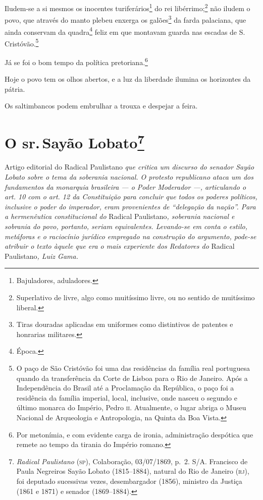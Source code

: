 Iludem-se a si mesmos os inocentes turiferários\footnote{Bajuladores,
  aduladores.} do rei libérrimo;\footnote{Superlativo de livre, algo
  como muitíssimo livre, ou no sentido de muitíssimo liberal.} não
iludem o povo, que através do manto plebeu enxerga os galões\footnote{
  Tiras douradas aplicadas em uniformes como distintivos de patentes e
  honrarias militares.} da farda palaciana, que ainda conservam da
quadra\footnote{Época.} feliz em que montavam guarda nas escadas de S.
Cristóvão.\footnote{O paço de São Cristóvão foi uma das residências da
  família real portuguesa quando da transferência da Corte de Lisboa
  para o Rio de Janeiro. Após a Independência do Brasil até a
  Proclamação da República, o paço foi a residência da família imperial,
  local, inclusive, onde nasceu o segundo e último monarca do Império,
  Pedro \textsc{ii}. Atualmente, o lugar abriga o Museu Nacional de Arqueologia e
  Antropologia, na Quinta da Boa Vista.}

Já se foi o bom tempo da política pretoriana.\footnote{Por metonímia, e
  com evidente carga de ironia, administração despótica que remete ao
  tempo da tirania do Império romano.}

Hoje o povo tem os olhos abertos, e a luz da liberdade ilumina os
horizontes da pátria.

Os saltimbancos podem embrulhar a trouxa e despejar a feira.

\chapter{O sr.\,Sayão Lobato\footnote{\emph{Radical Paulistano} (\textsc{sp}),
  Colaboração, 03/07/1869, p.~2. S/A. Francisco de Paula Negreiros Sayão
  Lobato (1815--1884), natural do Rio de Janeiro (\textsc{rj}), foi deputado
  sucessivas vezes, desembargador (1856), ministro da Justiça (1861 e
  1871) e senador (1869--1884).}}

\begin{didascalia}
Artigo editorial do Radical Paulistano \emph{que critica um discurso do
senador Sayão Lobato sobre o tema da soberania nacional. O protesto
republicano ataca um dos fundamentos da monarquia brasileira --- o Poder
Moderador ---, articulando o art. 10 com o art. 12 da Constituição para
concluir que todos os poderes políticos, inclusive o poder do imperador,
eram provenientes de ``delegação da nação''. Para a hermenêutica
constitucional do} Radical Paulistano\emph{, soberania nacional e
sobrania do povo, portanto, seriam equivalentes. Levando-se em conta o
estilo, metáforas e o raciocínio jurídico empregado na construção do
argumento, pode-se atribuir o texto àquele que era o mais experiente dos
Redatores do} Radical Paulistano\emph{, Luiz Gama.}
\end{didascalia}



